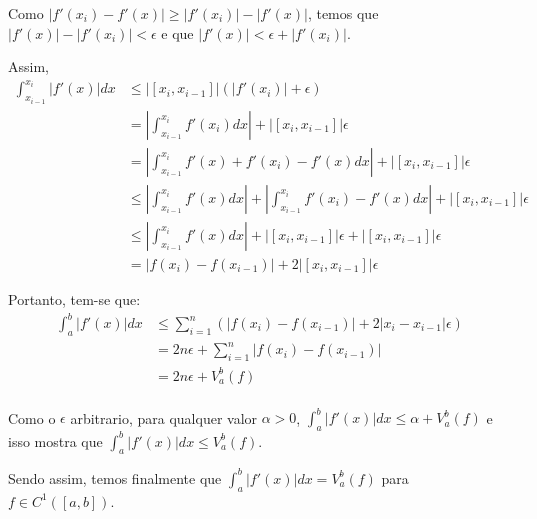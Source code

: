 Como $|f'(x_i) - f'(x)| \ge |f'(x_i)| - |f'(x)|$, temos \tambem que $|f'(x)| - |f'(x_i)| < \epsilon$ e que $|f'(x)| < \epsilon + |f'(x_i)|$.

Assim,
\begin{align*}
	\int_{x_{i-1}}^{x_i} |f'(x)|dx &\le |[x_i,x_{i-1}]|(|f'(x_i)| + \epsilon) \\
	&= |\int_{x_{i-1}}^{x_i} f'(x_i)dx| + |[x_i,x_{i-1}]|\epsilon \\
	&= |\int_{x_{i-1}}^{x_i} f'(x) + f'(x_i) - f'(x)dx| + |[x_i,x_{i-1}]|\epsilon \\
	&\le |\int_{x_{i-1}}^{x_i} f'(x) dx|  + |\int_{x_{i-1}}^{x_i} f'(x_i) - f'(x)dx| + |[x_i,x_{i-1}]|\epsilon \\
	&\le |\int_{x_{i-1}}^{x_i} f'(x) dx|  + |[x_i,x_{i-1}]|\epsilon + |[x_i,x_{i-1}]|\epsilon \\
	&= |f(x_i) - f(x_{i-1})| + 2|[x_i,x_{i-1}]|\epsilon
\end{align*}

Portanto, tem-se que:
\begin{align*}
	\int_{a}^{b} |f'(x)|dx &\le \sum_{i=1}^{n} (|f(x_i) - f(x_{i-1})| + 2|x_i-x_{i-1}|\epsilon) \\
	&= 2n\epsilon + \sum_{i=1}^{n} |f(x_i) - f(x_{i-1})| \\
	&= 2n\epsilon + V_a^b (f) \\
\end{align*}

Como o $\epsilon$ \eh arbitrario, para qualquer valor $\alpha > 0$, $	\int_{a}^{b} |f'(x)|dx \le \alpha + V_a^b (f)$ e isso mostra que $\int_{a}^{b} |f'(x)|dx \le V_a^b (f)$.

Sendo assim, temos finalmente que $\int_{a}^{b} |f'(x)|dx = V_a^b (f)$ para $f \in C^1([a,b])$.











